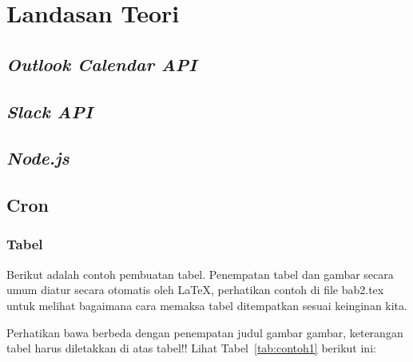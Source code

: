 \chapter{Landasan Teori}
\label{chap:teori}

\section{\textit{Outlook Calendar API}}
\label{sec:outlookCalendar} 


\section{\textit{Slack API}}
\label{sec:slack}


\section{\textit{Node.js}}
\label{sec:nodejs}


\section{Cron}
\label{sec:cron}
 

\subsection{Tabel}  
Berikut adalah contoh pembuatan tabel. 
Penempatan tabel dan gambar secara umum diatur secara otomatis oleh \LaTeX{}, perhatikan contoh di file bab2.tex untuk melihat bagaimana cara memaksa tabel ditempatkan sesuai keinginan kita.

Perhatikan bawa berbeda dengan penempatan judul gambar gambar, keterangan tabel harus diletakkan di atas tabel!!
Lihat Tabel~\ref{tab:contoh1} berikut ini:

